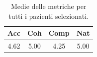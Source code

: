 
\begin{table}[!h]
\centering
\begin{tabular}{||c c c c||}
\hline
Acc & Coh & Comp & Nat \\ [0.5ex]
\hline\hline
4.62 & 5.00 & 4.25 & 5.00 \\
\hline
\end{tabular}
\caption{Medie delle metriche per tutti i pazienti selezionati.}
\label{tab:metriche_finali_pazienti}
\end{table}

